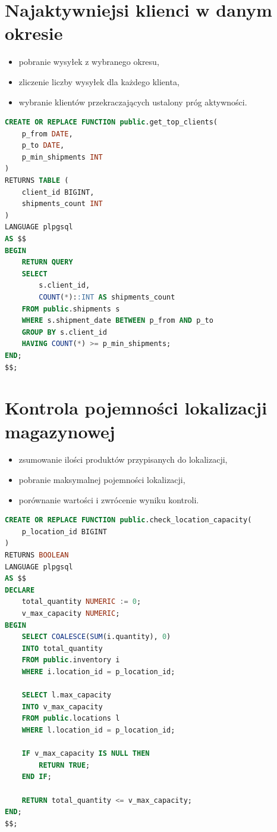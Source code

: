 \section{Najaktywniejsi klienci w danym okresie}
\begin{itemize}
    \item pobranie wysyłek z wybranego okresu,
    \item zliczenie liczby wysyłek dla każdego klienta,
    \item wybranie klientów przekraczających ustalony próg aktywności.
\end{itemize}

\begin{lstlisting}[language=SQL, caption={Funkcja identyfikująca najaktywniejszych klientów}]
CREATE OR REPLACE FUNCTION public.get_top_clients(
    p_from DATE,
    p_to DATE,
    p_min_shipments INT
)
RETURNS TABLE (
    client_id BIGINT,
    shipments_count INT
)
LANGUAGE plpgsql
AS $$
BEGIN
    RETURN QUERY
    SELECT
        s.client_id,
        COUNT(*)::INT AS shipments_count
    FROM public.shipments s
    WHERE s.shipment_date BETWEEN p_from AND p_to
    GROUP BY s.client_id
    HAVING COUNT(*) >= p_min_shipments;
END;
$$;
\end{lstlisting}

\section{Kontrola pojemności lokalizacji magazynowej}
\begin{itemize}
    \item zsumowanie ilości produktów przypisanych do lokalizacji,
    \item pobranie maksymalnej pojemności lokalizacji,
    \item porównanie wartości i zwrócenie wyniku kontroli.
\end{itemize}

\begin{lstlisting}[language=SQL, caption={Funkcja kontrolująca pojemność lokalizacji}]
CREATE OR REPLACE FUNCTION public.check_location_capacity(
    p_location_id BIGINT
)
RETURNS BOOLEAN
LANGUAGE plpgsql
AS $$
DECLARE
    total_quantity NUMERIC := 0;
    v_max_capacity NUMERIC;
BEGIN
    SELECT COALESCE(SUM(i.quantity), 0)
    INTO total_quantity
    FROM public.inventory i
    WHERE i.location_id = p_location_id;

    SELECT l.max_capacity
    INTO v_max_capacity
    FROM public.locations l
    WHERE l.location_id = p_location_id;

    IF v_max_capacity IS NULL THEN
        RETURN TRUE;
    END IF;

    RETURN total_quantity <= v_max_capacity;
END;
$$;
\end{lstlisting}

